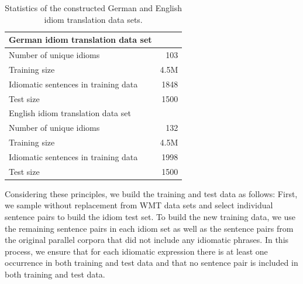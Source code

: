  \begin{table}[htb!]
\centering
\small
\caption{Statistics of the constructed German and English idiom translation data sets. %
\label{stats}}
\begin{tabular}{l r}
 \toprule
  German idiom translation data set & \\
  \midrule
Number of unique idioms & 103   \\
  Training size & 4.5M \\   
  Idiomatic sentences in training data & 1848 \\
 Test size & 1500  \\
\toprule
  English idiom translation data set & \\
  \midrule
Number of unique idioms &  132  \\
  Training size & 4.5M \\
  Idiomatic sentences in training data & 1998  \\
 Test size & 1500  \\
\bottomrule
\end{tabular}
\end{table}


Considering these principles, we build the training and test data as follows:
First, we sample without replacement from WMT data sets and select individual sentence pairs to build the idiom test set.
To build the new training data, we use the remaining sentence pairs in each idiom set as well as the sentence pairs from the original parallel corpora that did not include any idiomatic phrases.
In this process, we ensure that for each idiomatic expression there is at least one occurrence in both training and test data and that no sentence pair is included in both training and test data. 

